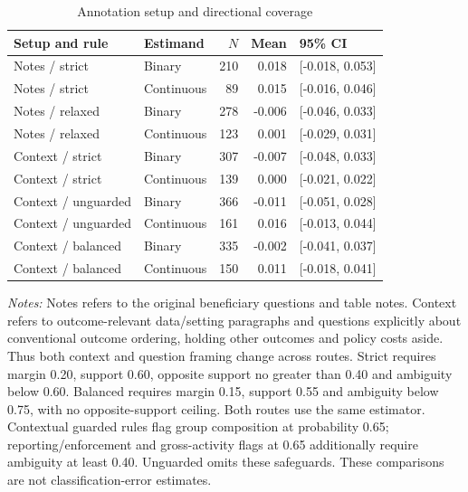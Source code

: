 \begin{table}[htbp]\centering\small
\caption{Annotation setup and directional coverage}\label{tab:direction_comparison}
\setlength{\tabcolsep}{4pt}
\begin{tabular}{llrrl}\toprule
Setup and rule & Estimand & $N$ & Mean & 95\% CI \\
\midrule
Notes / strict & Binary & 210 & 0.018 & [-0.018, 0.053] \\
Notes / strict & Continuous & 89 & 0.015 & [-0.016, 0.046] \\
Notes / relaxed & Binary & 278 & -0.006 & [-0.046, 0.033] \\
Notes / relaxed & Continuous & 123 & 0.001 & [-0.029, 0.031] \\
Context / strict & Binary & 307 & -0.007 & [-0.048, 0.033] \\
Context / strict & Continuous & 139 & 0.000 & [-0.021, 0.022] \\
Context / unguarded & Binary & 366 & -0.011 & [-0.051, 0.028] \\
Context / unguarded & Continuous & 161 & 0.016 & [-0.013, 0.044] \\
Context / balanced & Binary & 335 & -0.002 & [-0.041, 0.037] \\
Context / balanced & Continuous & 150 & 0.011 & [-0.018, 0.041] \\
\bottomrule\end{tabular}
\par\vspace{4pt}\begin{minipage}{\textwidth}\footnotesize
\textit{Notes:} Notes refers to the original beneficiary questions and table notes. Context refers to outcome-relevant data/setting paragraphs and questions explicitly about conventional outcome ordering, holding other outcomes and policy costs aside. Thus both context and question framing change across routes. Strict requires margin 0.20, support 0.60, opposite support no greater than 0.40 and ambiguity below 0.60. Balanced requires margin 0.15, support 0.55 and ambiguity below 0.75, with no opposite-support ceiling. Both routes use the same estimator. Contextual guarded rules flag group composition at probability 0.65; reporting/enforcement and gross-activity flags at 0.65 additionally require ambiguity at least 0.40. Unguarded omits these safeguards. These comparisons are not classification-error estimates.
\end{minipage}
\end{table}

